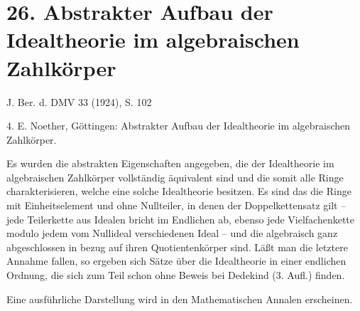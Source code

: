﻿\section*{26. Abstrakter Aufbau der Idealtheorie im algebraischen Zahlkörper}

\begin{center}
J. Ber. d. DMV 33 (1924), S. 102
\end{center}

4. E. Noether, Göttingen: Abstrakter Aufbau der Idealtheorie im algebraischen Zahlkörper.

Es wurden die abstrakten Eigenschaften angegeben, die der Idealtheorie im algebraischen Zahlkörper vollständig äquivalent sind und die somit alle Ringe charakterisieren, welche eine solche Idealtheorie besitzen. Es sind das die Ringe mit Einheitselement und ohne Nullteiler, in denen der Doppelkettensatz gilt -- jede Teilerkette aus Idealen bricht im Endlichen ab, ebenso jede Vielfachenkette modulo jedem vom Nullideal verschiedenen Ideal -- und die algebraisch ganz abgeschlossen in bezug auf ihren Quotientenkörper sind. Läßt man die letztere Annahme fallen, so ergeben sich Sätze über die Idealtheorie in einer endlichen Ordnung, die sich zum Teil schon ohne Beweis bei Dedekind (3. Aufl.) finden.

Eine ausführliche Darstellung wird in den Mathematischen Annalen erscheinen.

